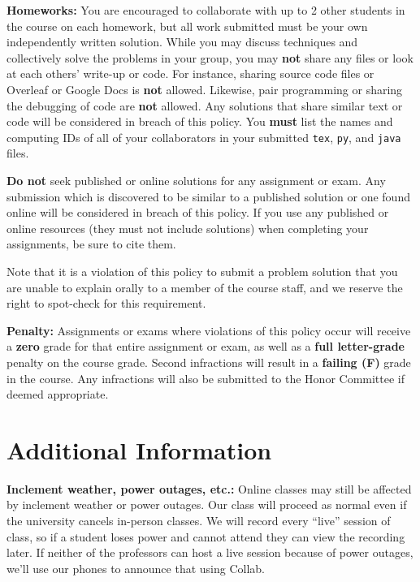 \documentclass[12pt]{article}
\begin{document}
\textbf{Homeworks:} You are encouraged to collaborate with up to 2 other students in the course on each homework, but all work submitted must be your own independently written solution.  While you may discuss techniques and collectively solve the problems in your group, you may \textbf{not} share any files or look at each others' write-up or code. For instance, sharing source code files or Overleaf or Google Docs is \textbf{not} allowed.  Likewise, pair programming or sharing the debugging of code are \textbf{not} allowed.  Any solutions that share similar text or code will be considered in breach of this policy. You \textbf{must} list the names and computing IDs of all of your collaborators in your submitted \texttt{tex}, \texttt{py}, and \texttt{java} files.

\textbf{Do not} seek published or online solutions for any assignment or exam. Any submission which is discovered to be similar to a published solution or one found online will be considered in breach of this policy. If you use any published or online resources (they must not include solutions) when completing your assignments, be sure to cite them. 

Note that it is a violation of this policy to submit a problem solution that you are unable to explain orally to a member of the course staff, and we reserve the right to spot-check for this requirement.

\textbf{Penalty:} Assignments or exams where violations of this policy occur will receive a \textbf{zero} grade for that entire assignment or exam, as well as a \textbf{full letter-grade} penalty on the course grade.  Second infractions will result in a \textbf{failing (F)} grade in the course.  Any infractions will also be submitted to the Honor Committee if deemed appropriate.

\section*{Additional Information}

\textbf{Inclement weather, power outages, etc.:} Online classes may still be affected by inclement weather or power outages.  Our class will proceed as normal even if the university cancels in-person classes. We will record every ``live'' session of class, so if a student loses power and cannot attend they can view the recording later.  If neither of the professors can host a live session because of power outages, we'll use our phones to announce that using Collab.
\end{document}
